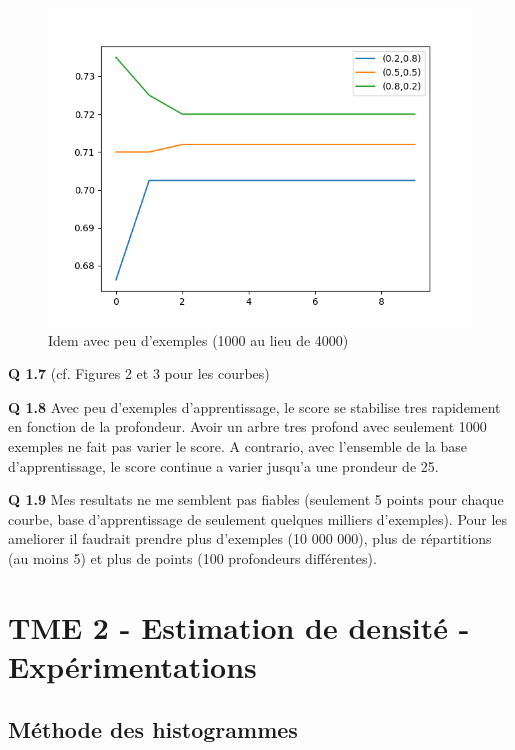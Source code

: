 \documentclass{article}
\begin{document}
\begin{center}
  \begin{figure}
    \includegraphics[width=\textwidth,
    keepaspectratio]{Figure_3}
    \caption{Idem avec peu d'exemples (1000 au lieu de
    4000)}
  \end{figure}
\end{center}


\textbf{Q 1.7} (cf. Figures 2 et 3 pour les courbes)

\textbf{Q 1.8} Avec peu d'exemples d'apprentissage, le score
se stabilise tres rapidement en fonction de la profondeur.
Avoir un arbre tres profond avec seulement 1000 exemples ne
fait pas varier le score. A contrario, avec l'ensemble de la
base d'apprentissage, le score continue a varier jusqu'a une
prondeur de 25.

\textbf{Q 1.9} Mes resultats ne me semblent pas fiables
(seulement 5 points pour chaque courbe, base d'apprentissage
de seulement quelques milliers d'exemples). Pour les
ameliorer il faudrait prendre plus d'exemples (10 000 000),
plus de répartitions (au moins 5) et plus de points (100
profondeurs différentes).







\section*{TME 2 - Estimation de densité - Expérimentations}

\subsection*{Méthode des histogrammes}
\end{document}
